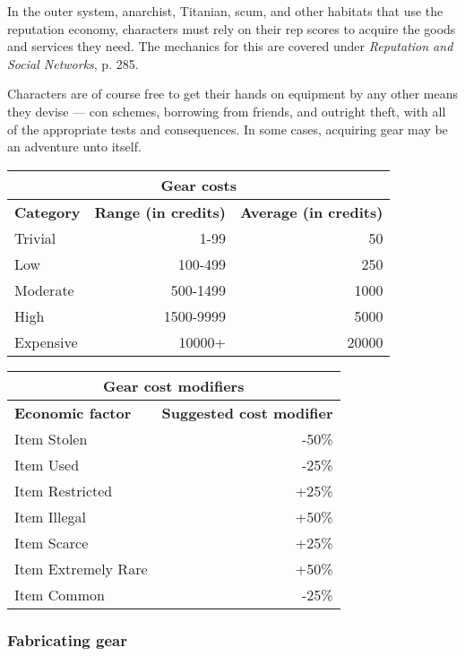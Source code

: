 In the outer system, anarchist, Titanian, scum, and other habitats that use the reputation economy, characters must rely on their rep scores to acquire the goods and services they need. The mechanics for this are covered under \emph{Reputation and Social Networks}, p. 285.

Characters are of course free to get their hands on equipment by any other means they devise --- con schemes, borrowing from friends, and outright theft, with all of the appropriate tests and consequences. In some cases, acquiring gear may be an adventure unto itself.

\begin{table}
\begin{tabular}{|l|r|r|}
\hline
\multicolumn{3}{|c|}{\textbf{Gear costs}}			\\
\hline
\textbf{Category}	& \textbf{Range (in credits)}	& \textbf{Average (in credits)} \\
\hline
Trivial			& 1-99					& 50 \\
\hline
Low				& 100-499					& 250 \\
\hline
Moderate			& 500-1499				& 1000 \\
\hline
High				& 1500-9999				& 5000 \\
\hline
Expensive			& 10000+					& 20000 \\
\hline
\end{tabular}
\label{tab:gear-costs}
\end{table}

\begin{table}
\begin{tabular}{|l|r|}
\hline
\multicolumn{2}{|c|}{\textbf{Gear cost modifiers}}			\\
\hline
\textbf{Economic factor}	& \textbf{Suggested cost modifier} \\
\hline
Item Stolen			& -50\% \\
\hline
Item Used				& -25\% \\
\hline
Item Restricted		& +25\% \\
\hline
Item Illegal			& +50\% \\
\hline
Item Scarce			& +25\% \\
\hline
Item Extremely Rare		& +50\% \\
\hline
Item Common			& -25\% \\
\hline
\end{tabular}
\label{tab:gear-cost-modifiers}
\end{table}

\subsubsection{Fabricating gear}

